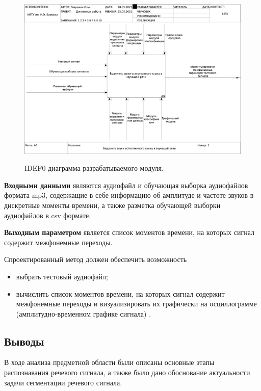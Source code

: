 \documentclass[utf8x, 14pt, oneside, a4paper]{article}
\begin{document}
	\begin{figure}[h!]
		\begin{center}
			{\includegraphics[scale = 0.3]{img/ramus_A0.png}}
		\end{center}
		\caption{IDEF0 диаграмма разрабатываемого модуля.}
		\label{ris:ramus_A0}
	\end{figure}
	
	{\bf Входными данными} являются аудиофайл и обучающая выборка аудиофайлов формата mp3, содержащие в себе информацию об амплитуде и частоте звуков в дискретные моменты времени, а также разметка обучающей выборки аудиофайлов в csv формате.
	
	{\bf Выходным параметром} является список моментов времени, на которых сигнал содержит межфонемные переходы.
	
	Спроектированный метод должен обеспечить возможность
	\begin{itemize}
		\item выбрать тестовый аудиофайл;
		\item вычислить список моментов времени, на которых сигнал содержит межфонемные переходы и визуализировать их графически на осциллограмме (амплитудно-временном графике сигнала) \cite{oszilograph}.
	\end{itemize}
	
	\subsection{Выводы}\label{anal_summary}
	
	В ходе анализа предметной области были описаны основные этапы распознавания речевого сигнала, а также было дано обоснование актуальности задачи сегментации речевого сигнала.
	
\end{document}
